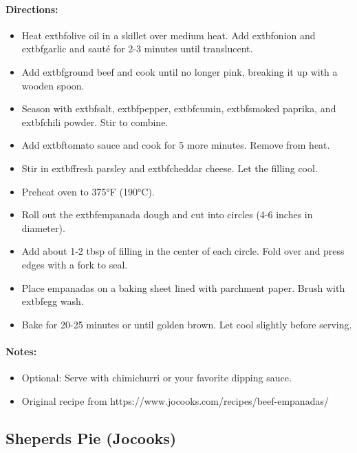 \documentclass{article}
\begin{document}
\paragraph{Directions:}
\begin{itemize}
    \item Heat 	extbf{olive oil} in a skillet over medium heat. Add 	extbf{onion} and 	extbf{garlic} and sauté for 2-3 minutes until translucent.
    \item Add 	extbf{ground beef} and cook until no longer pink, breaking it up with a wooden spoon.
    \item Season with 	extbf{salt}, 	extbf{pepper}, 	extbf{cumin}, 	extbf{smoked paprika}, and 	extbf{chili powder}. Stir to combine.
    \item Add 	extbf{tomato sauce} and cook for 5 more minutes. Remove from heat.
    \item Stir in 	extbf{fresh parsley} and 	extbf{cheddar cheese}. Let the filling cool.
    \item Preheat oven to 375°F (190°C).
    \item Roll out the 	extbf{empanada dough} and cut into circles (4-6 inches in diameter).
    \item Add about 1-2 tbsp of filling in the center of each circle. Fold over and press edges with a fork to seal.
    \item Place empanadas on a baking sheet lined with parchment paper. Brush with 	extbf{egg wash}.
    \item Bake for 20-25 minutes or until golden brown. Let cool slightly before serving.
\end{itemize}

\paragraph{Notes:}
\begin{itemize}
    \item Optional: Serve with chimichurri or your favorite dipping sauce.
    \item Original recipe from https://www.jocooks.com/recipes/beef-empanadas/
\end{itemize}

\subsection{Sheperds Pie (Jocooks)} 
\end{document}
